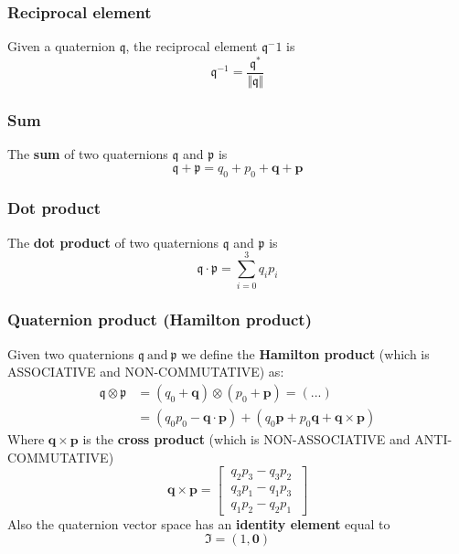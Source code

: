 {\color{red} \subsubsection*{Reciprocal element}}
\noindent
Given a quaternion $\mathfrak{q}$, the reciprocal element $\mathfrak{q}^-1$ is
{\Large{
    \begin{equation*}
        \mathfrak{q}^{-1}=\frac{\mathfrak{q}^*}{\Vert \mathfrak{q} \Vert}
    \end{equation*}
}} 

{\color{red} \subsubsection*{Sum}}
\noindent
The \textbf{sum} of two quaternions $\mathfrak{q}$ and  $\mathfrak{p}$ is
{\Large{
    \begin{equation*}
        \mathfrak{q}+\mathfrak{p}=q_0+p_0+\mathbf{q}+\mathbf{p}
    \end{equation*}
}}

{\color{red} \subsubsection*{Dot product}}
\noindent
The \textbf{dot product} of two quaternions $\mathfrak{q}$ and $\mathfrak{p}$ is
{\Large{
    \begin{equation*}
        \mathfrak{q} \cdot \mathfrak{p} = 
        \sum_{i=0}^3 {q_i p_i}
    \end{equation*}
}}
 
{\color{red} \subsubsection*{Quaternion product (Hamilton product)}}
\noindent
Given two quaternions $\mathfrak{q} \ \text{and} \ \mathfrak{p}$ we define the \textbf{Hamilton product} (\textsf{which is ASSOCIATIVE and NON-COMMUTATIVE}) as:
{\Large{
    \begin{align*}
        \mathfrak{q} \otimes \mathfrak{p} &= 
        (q_0+\mathbf{q}) \otimes (p_0+\mathbf{p}) = (...)\\
        &= (q_0p_0-\mathbf{q}\cdot\mathbf{p})+(q_0\mathbf{p}+p_0\mathbf{q}+\mathbf{q}\times\mathbf{p})
    \end{align*}
}}
Where $\mathbf{q}\times\mathbf{p}$ is the \textbf{cross product} (\textsf{which is NON-ASSOCIATIVE and ANTI-COMMUTATIVE})
\begin{equation*}
    \mathbf{q}\times\mathbf{p}=
    \begin{bmatrix}
        \ q_2p_3-q_3p_2 \ \\
        \ q_3p_1-q_1p_3 \ \\
        \ q_1p_2-q_2p_1 \
    \end{bmatrix}
\end{equation*}
Also the quaternion vector space has an \textbf{identity element} equal to
{\Large{
    \begin{equation*}
        \mathfrak{I} = (1, \mathbf{0})
    \end{equation*}
}}

